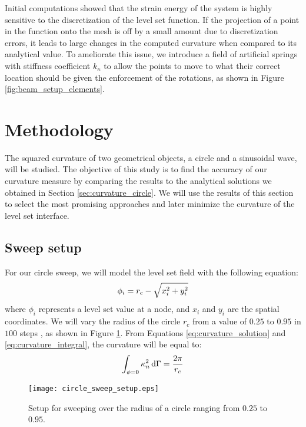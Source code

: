 Initial computations showed that the strain energy of the system is highly sensitive to the discretization of the level set function. If the projection of a point in the function onto the mesh is off by a small amount due to discretization errors, it leads to large changes in the computed curvature when compared to its analytical value. To ameliorate this issue, we introduce a field of artificial springs with stiffness coefficient $k_{\kappa}$ to allow the points to move to what their correct location should be given the enforcement of the rotations, as shown in Figure \ref{fig:beam_setup_elements}.


\section{Methodology}
\label{sec:numerical_sweeps}

The squared curvature of two geometrical objects, a circle and a sinusoidal wave, will be studied. The objective of this study is to find the accuracy of our curvature measure by comparing the results to the analytical solutions we obtained in Section \ref{sec:curvature_circle}. We will use the results of this section to select the most promising approaches and later minimize the curvature of the level set interface.


\subsection{Sweep setup}
\label{sec:sweep_setup}

For our circle sweep, we will model the level set field with the following equation:
%
\begin{equation}
	\centering
	\label{eq:level_set_circle}
	\phi_{i} = r_{c} - \sqrt{x_{i} ^ 2 + y_{i} ^ 2}
\end{equation}
%
where $\phi_{i}$ represents a level set value at a node, and $x_{i}$ and $y_{i}$ are the spatial coordinates. We will vary the radius of the circle $r_{c}$ from a value of $0.25$ to $0.95$ in $100$ steps , as shown in Figure \ref{fig:circle_sweep_setup}. From Equations \ref{eq:curvature_solution} and \ref{eq:curvature_integral}, the curvature will be equal to:
%
\begin{equation}
	\centering
	\label{eq:curvature_analytical_circle}
	\int_{\phi=0} \kappa_{n}^2 \,\mathrm{d}\Gamma = \frac{2\pi}{r_{c}}
\end{equation}
%
\begin{figure}[H]
	\centering
	\texttt{[image: circle\_sweep\_setup.eps]}
	\caption{Setup for sweeping over the radius of a circle ranging from $0.25$ to $0.95$.}
	\label{fig:circle_sweep_setup}
\end{figure}

